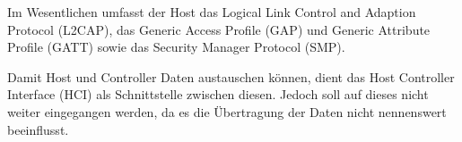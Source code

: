 Im Wesentlichen umfasst der Host das Logical Link Control and Adaption Protocol (L2CAP), das Generic Access Profile (GAP) und Generic Attribute Profile (GATT) sowie das Security Manager Protocol (SMP).

Damit Host und Controller Daten austauschen können, dient das Host Controller Interface (HCI) als Schnittstelle zwischen diesen. Jedoch soll auf dieses nicht weiter eingegangen werden, da es die Übertragung der Daten nicht nennenswert beeinflusst.